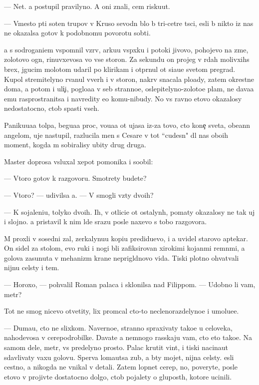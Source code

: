 \documentclass[10pt]{book}
\begin{document}
— Net. {\Y}a postupil pravilyno. A oni znali, cem risku{\y}ut.

— Vmesto p{\ia}ti soten trupov v Kruso sevodn{\ia} b{\yi}lo b{\yi} tri-cet{\yi}re t{\yi}s{\ia}ci, {\y}esli b{\yi} nikto iz nas ne okazalsa gotov k podobnomu povorotu sob{\yi}ti{\y}.

{\Y}a s sodrogani{\y}em vspomnil vzr{\yi}v, {\y}arku{\y}u vsp{\yi}xku i potoki jivovo, pohojevo na zme{\y}, zolotovo ogn{\ia}, rinuvxevosa vo vse storon{\yi}. Za sekundu on projeg v r{\ia}dah molivxihs{\ia} brex, jgucim molotom udaril po klirikam i otpr{\ia}nul ot si{\y}a{\y}u{\x}e{\y} svetom pregrad{\yi}. Kupol stremitelyno rvanul vverh i v storon{\yi}, nakr{\yi}v snacala plo{\x}ady, zatem okrestn{\yi}{\y}e doma, a potom i uli{\c}i, poglo{\x}a{\y}a v seb{\ia} stranno{\y}e, oslepitelyno-zoloto{\y}e plam{\ia}, ne dava{\y}a {\y}emu rasprostranitsa i navredity {\y}e{\x}o komu-nibudy. No vs{\e} ravno etovo okazalosy nedostatocno, ctob{\yi} spasti vseh.

Paniku{\y}u{\x}a{\y}a tolpa, begu{\x}a{\y}a proc, vo{\y}u{\x}a{\y}a ot ujasa iz-za tovo, cto kone{\c} sveta, obe{\x}ann{\yi}{\y} angelom, uje nastupil, razlucila men{\ia} s Cesare v tot ``cudesn{\yi}{\y}" dl{\ia} nas obo{\y}ih moment, kogda m{\yi} sobiralisy ubity drug druga.

Master doprosa v{\yi}sluxal xepot pomo{\x}nika i soob{\x}il:

— Vtoro{\y} gotov k razgovoru. Smotrety budete?

— Vtoro{\y}? — udivilsa {\y}a. — V{\yi} smogli vz{\ia}ty dvo{\y}ih?

— K sojaleni{\y}u, tolyko dvo{\y}ih. Ih, v otlici{\y}e ot ostalyn{\yi}h, po{\y}maty okazalosy ne tak uj i slojno. {\Y}a pristavil k nim l{\iu}de{\y} srazu posle naxevo s tobo{\y} razgovora.

M{\yi} proxli v sosedni{\y} zal, zerkalynu{\y}u kopi{\y}u predidu{\x}evo, i {\y}a uvidel starovo aptekar{\ia}. On sidel za stolom, {\y}evo ruki i nogi b{\yi}li zafiksirovan{\yi} xirokimi kojan{\yi}mi remn{\ia}mi, a golova zasunuta v mehanizm kra{\y}ne neprigl{\ia}dnovo vida. Tiski plotno ohvat{\yi}vali nijn{\iu}{\y}u cel{\iu}sty i tem{\ia}.

— Horoxo, — pohvalil Roman palaca i sklonilsa nad Filippom. — Udobno li vam, metr?

Tot ne smog nicevo otvetity, lix prom{\yi}cal cto-to neclenorazdelyno{\y}e i umol{\ia}{\y}u{\x}e{\y}e.

— Duma{\y}u, cto ne slixkom. Naverno{\y}e, stranno spraxivaty tako{\y}e u celoveka, nahod{\ia}{\x}evosa v cerepodrobilke. Dava{\y}te {\y}a nemnogo rasskaju vam, cto eto tako{\y}e. Na samom dele, metr, vs{\e} predelyno prosto. Palac krutit vint, i tiski nacina{\y}ut sdavlivaty vaxu golovu. Sperva loma{\y}utsa zub{\yi}, a b{\yi}ty mojet, nijn{\ia}{\y}a cel{\iu}sty. {\Y}esli cestno, {\y}a nikogda ne vnikal v detali. Zatem lopnet cerep, no, poveryte, posle etovo v{\yi} projiv{\e}te dostatocno dolgo, ctob{\yi} pojalety o glupost{\ia}h, kotor{\yi}{\y}e ucinili.
\end{document}
